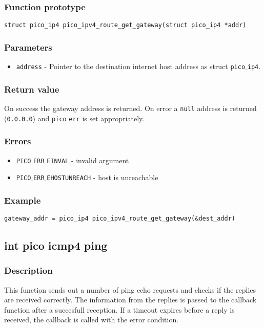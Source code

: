 \subsubsection*{Function prototype}
\begin{verbatim}
struct pico_ip4 pico_ipv4_route_get_gateway(struct pico_ip4 *addr)
\end{verbatim}

\subsubsection*{Parameters}
\begin{itemize}[noitemsep]
\item \texttt{address} - Pointer to the destination internet host address as struct \texttt{pico$\_$ip4}.
\end{itemize}

\subsubsection*{Return value}
On success the gateway address is returned.
On error a \texttt{null} address is returned (\texttt{0.0.0.0}) and \texttt{pico$\_$err} is set appropriately.

\subsubsection*{Errors}
\begin{itemize}[noitemsep]
\item \texttt{PICO$\_$ERR$\_$EINVAL} - invalid argument
\item \texttt{PICO$\_$ERR$\_$EHOSTUNREACH} - host is unreachable
\end{itemize}

\subsubsection*{Example}
\begin{verbatim}
gateway_addr = pico_ip4 pico_ipv4_route_get_gateway(&dest_addr)
\end{verbatim}


\subsection{int$\_$pico$\_$icmp4$\_$ping}

\subsubsection*{Description}
This function sends out a number of ping echo requests and checks if the replies are received correctly.
The information from the replies is passed to the callback function after a succesfull reception.
If a timeout expires before a reply is received, the callback is called with the error condition.

